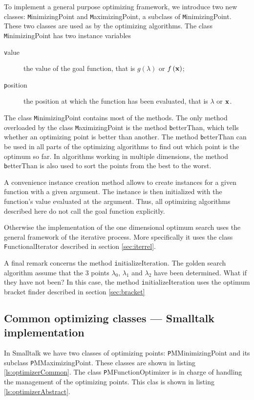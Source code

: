 To implement a general purpose optimizing framework, we introduce
two new classes: {\texttt MinimizingPoint} and {\texttt MaximizingPoint},
 a subclass of {\texttt MinimizingPoint}. These two classes
are used as  by the optimizing algorithms. The
class {\texttt MinimizingPoint} has two instance variables
\begin{description}
  \item[\texttt value] the value of the goal function, that is
  $g\left(\lambda\right)$ or $f\left({\textbf x}\right)$;
  \item[\texttt position] the position at which the function has been
  evaluated, that is $\lambda$ or ${\textbf x}$.
\end{description}
The class {\texttt MinimizingPoint} contains most of the methods. The
only method overloaded by the class {\texttt MaximizingPoint} is the
method {\texttt betterThan}, which tells whether an optimizing point
is better than another. The method {\texttt betterThan} can be used in
all parts of the optimizing algorithms to find out which point is
the optimum so far. In algorithms working in multiple dimensions,
the method {\texttt betterThan} is also used to sort the points from
the best to the worst.

A convenience instance creation method allows to create instances
for a given function with a given argument. The instance is then
initialized with the function's value evaluated at the argument.
Thus, all optimizing algorithms described here do not call the
goal function explicitly.

Otherwise the implementation of the one dimensional optimum search
uses the general framework of the iterative process. More
specifically it uses the class {\texttt FunctionalIterator} described
in section \ref{sec:iterrel}.

A final remark concerns the method {\texttt initializeIteration}. The
golden search algorithm assume that the 3 points $\lambda_0$,
$\lambda_1$ and $\lambda_2$ have been determined. What if they
have not been? In this case, the method {\texttt initializeIteration}
uses the optimum bracket finder described in section
\ref{sec:bracket}

\subsection{Common optimizing classes --- Smalltalk implementation}
\label{sec:sgeneralOpt}  In Smalltalk we have two classes
of optimizing points: {\texttt PMMinimizingPoint} and its subclass
{\texttt PMMaximizingPoint}. These classes are shown in listing
\ref{ls:optimizerCommon}. The class {\texttt PMFunctionOptimizer} is
in charge of handling the management of the optimizing points.
This clas is shown in listing \ref{ls:optimizerAbstract}.


